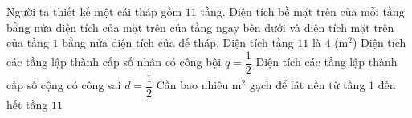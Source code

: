 \begin{ex}%
	Người ta thiết kế một cái tháp gồm $11$ tầng. Diện tích bề mặt trên của mỗi tầng bằng nửa diện tích của mặt trên của tầng ngay bên dưới và diện tích mặt trên của tầng $1$ bằng nửa diện tích của đế tháp.
	\choiceTF
	{Diện tích tầng $11$ là $4$ (m$^2$)}
	{\True Diện tích các tầng lập thành cấp số nhân có công bội $q=\dfrac{1}{2}$}
	{Diện tích các tầng lập thành cấp số cộng có công sai $d=\dfrac{1}{2}$}
	{\True Cần bao nhiêu m$^2$ gạch để lát nền từ tầng $1$ đến hết tầng $11$}
\end{ex}

